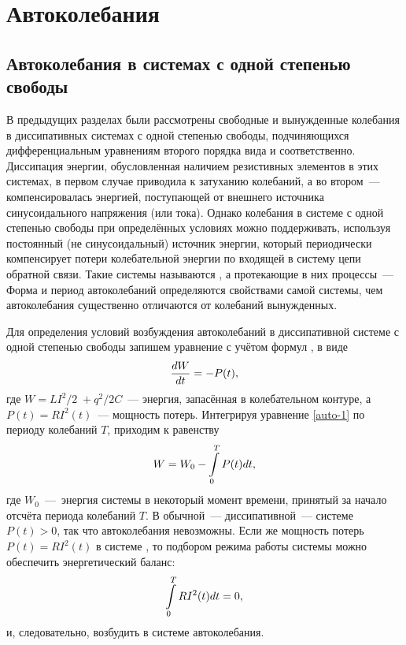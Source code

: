 \section{Автоколебания}

\subsection{Автоколебания в системах с одной степенью свободы}
В предыдущих разделах были рассмотрены свободные и вынужденные колебания в диссипативных системах с одной степенью свободы, подчиняющихся дифференциальным уравнениям второго порядка вида  и  соответственно. Диссипация энергии, обусловленная наличием резистивных элементов в этих системах, в первом случае приводила к затуханию колебаний, а во втором~--- компенсировалась энергией, поступающей от
внешнего источника синусоидального напряжения (или тока). Однако колебания в системе с одной степенью свободы при определённых условиях можно поддерживать, используя постоянный (не синусоидальный) источник энергии, который периодически компенсирует потери колебательной энергии по входящей в систему цепи обратной связи. Такие системы называются , а протекающие в них процессы~---  Форма и период автоколебаний определяются свойствами самой системы, чем автоколебания существенно отличаются от колебаний вынужденных.

Для определения условий возбуждения автоколебаний в диссипативной системе с одной степенью свободы запишем уравнение  с учётом формул ,  в виде
\begin{equation}
	\eqmark{auto-1}
	\frac{dW}{dt}=-P(t),
\end{equation}
где $W={LI^2}/{2}\;+{q^2}/{2C}$~--- энергия, запасённая в колебательном контуре, а $P(t)=R{{I}^{2}}(t)$~--- мощность потерь. Интегрируя уравнение \eqref{auto-1} по периоду колебаний $T$, приходим к равенству
\begin{equation}
	\eqmark{auto-2}
	W=W_0-\int\limits_{0}^{T}P(t)dt,
\end{equation}
где $W_0$~---~энергия системы в некоторый момент времени, принятый за начало отсчёта периода колебаний $T$. В обычной~--- диссипативной~--- системе $P(t)>0$, так что автоколебания невозможны. Если же мощность потерь $P(t)=R{{I}^{2}}(t)$ в системе , то подбором режима работы системы можно обеспечить энергетический баланс:
\begin{equation}
	\eqmark{auto-3}
	\int\limits_{0}^{T}{R{{I}^{2}}(t)dt}=0,
\end{equation}
и, следовательно, возбудить в системе автоколебания.

